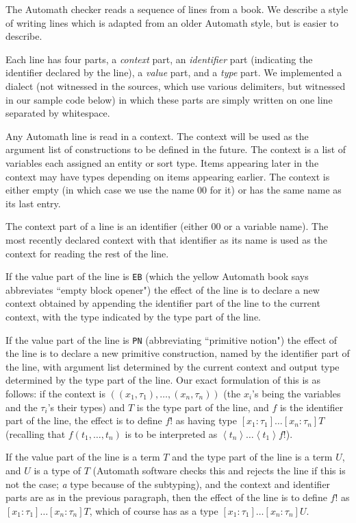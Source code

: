 \documentclass{article}
\begin{document}
The Automath checker reads a sequence of lines from a book.  We describe a style of writing lines which is adapted from an older Automath style, but is easier to describe.

Each line has four parts, a {\em context\/} part, an {\em identifier\/} part (indicating the identifier declared by the line), a {\em value\/} part, and a {\em type\/} part.  We implemented a dialect (not witnessed in the sources, which use various delimiters, but witnessed in our sample code below) in which these parts are simply written on one line separated by whitespace.

Any Automath line is read in a context.  The context will be used as the argument list of constructions to be defined in the future.  The context is a list of variables each assigned an entity or sort type.  Items appearing later in the context may have types depending on items appearing earlier.  The context is either empty (in which case we use the name 00 for it) or has the same name as its last entry.

The context part of a line is an identifier (either 00 or a variable name).  The most recently declared context with that identifier as its name
is used as the context for reading the rest of the line.


If the value part of the line is {\tt EB} (which the yellow Automath book says abbreviates ``empty block opener") the effect of the line is to declare a new context obtained by appending the identifier part of the line to the current context, with the type indicated by the type part of the line.

If the value part of the line is {\tt PN} (abbreviating ``primitive notion") the effect of the line is to declare a new primitive construction, named by the identifier part of the line, with argument list determined by the current context and output type determined by the type part of the line.  Our exact formulation of this
is as follows:  if the context is $((x_1,\tau_1),\ldots,(x_n,\tau_n))$ (the $x_i$'s being the variables and the $\tau_i$'s their types) and $T$ is the type part of the line, and $f$ is the identifier part of the line, the effect is to define $f!$ as having type $[x_1:\tau_1]\ldots[x_n:\tau_n]T$ (recalling that
$f(t_1,\ldots,t_n)$ is to be interpreted as $\left<t_n\right>\ldots\left<t_1\right>f!$).



If the value part of the line is a term $T$ and the type part of the line is a term $U$, and $U$ is a type of $T$ (Automath software checks this and rejects the line if this is not the case; {\em a\/} type because of the subtyping), and the context and identifier parts are as in the previous paragraph,  then the effect of the line is to define $f!$ as $[x_1:\tau_1]\ldots[x_n:\tau_n]T$, which of course has as a type $[x_1:\tau_1]\ldots[x_n:\tau_n]U$.
\end{document}
